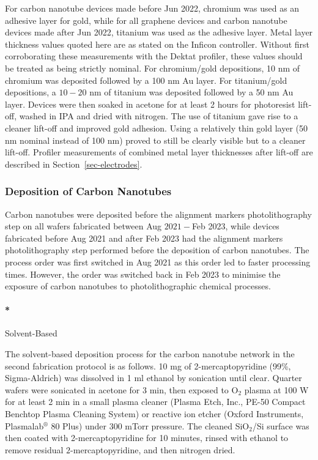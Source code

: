\documentclass[
  letterpaper,
  DIV=11,
  numbers=noendperiod]{scrartcl}
\let\oldparagraph\paragraph
\renewcommand{\paragraph}[1]{\oldparagraph{#1}\mbox{}}
\begin{document}
For carbon nanotube devices made before Jun 2022, chromium was used as
an adhesive layer for gold, while for all graphene devices and carbon
nanotube devices made after Jun 2022, titanium was used as the adhesive
layer. Metal layer thickness values quoted here are as stated on the
Inficon controller. Without first corroborating these measurements with
the Dektat profiler, these values should be treated as being strictly
nominal. For chromium/gold depositions, 10 nm of chromium was deposited
followed by a 100 nm Au layer. For titanium/gold depositions, a
\(10-20\) nm of titanium was deposited followed by a 50 nm Au layer.
Devices were then soaked in acetone for at least 2 hours for photoresist
lift-off, washed in IPA and dried with nitrogen. The use of titanium
gave rise to a cleaner lift-off and improved gold adhesion. Using a
relatively thin gold layer (50 nm nominal instead of 100 nm) proved to
still be clearly visible but to a cleaner lift-off. Profiler
measurements of combined metal layer thicknesses after lift-off are
described in Section~\ref{sec-electrodes}.

\hypertarget{sec-dep-carbon-nanotubes}{%
\subsubsection{Deposition of Carbon
Nanotubes}\label{sec-dep-carbon-nanotubes}}

Carbon nanotubes were deposited before the alignment markers
photolithography step on all wafers fabricated between Aug \(2021-\)Feb
2023, while devices fabricated before Aug 2021 and after Feb 2023 had
the alignment markers photolithography step performed before the
deposition of carbon nanotubes. The process order was first switched in
Aug 2021 as this order led to faster processing times. However, the
order was switched back in Feb 2023 to minimise the exposure of carbon
nanotubes to photolithographic chemical processes.

\hypertarget{solvent-based}{%
\paragraph*{Solvent-Based}\label{solvent-based}}

The solvent-based deposition process for the carbon nanotube network in
the second fabrication protocol is as follows. 10 mg of
2-mercaptopyridine (99\%, Sigma-Aldrich) was dissolved in 1 ml ethanol
by sonication until clear. Quarter wafers were sonicated in acetone for
3 min, then exposed to O\(_2\) plasma at 100 W for at least 2 min in a
small plasma cleaner (Plasma Etch, Inc., PE-50 Compact Benchtop Plasma
Cleaning System) or reactive ion etcher (Oxford Instruments,
Plasmalab\(^\circledR\) 80 Plus) under 300 mTorr pressure. The cleaned
SiO\(_2\)/Si surface was then coated with 2-mercaptopyridine for 10
minutes, rinsed with ethanol to remove residual \(2\)-mercaptopyridine,
and then nitrogen dried.
\end{document}
